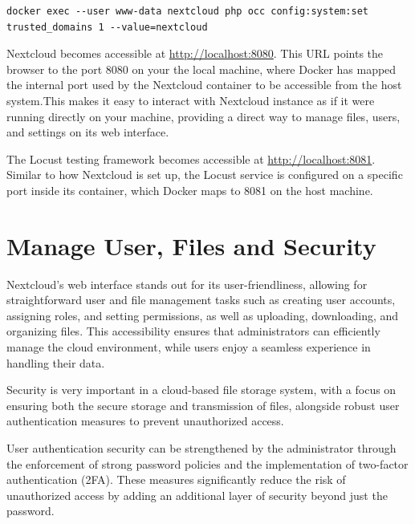 \documentclass[12pt]{article}
\begin{document}
\begin{verbatim}
docker exec --user www-data nextcloud php occ config:system:set
trusted_domains 1 --value=nextcloud
\end{verbatim}


Nextcloud becomes accessible at \url{http://localhost:8080}. This URL points the browser to the port 8080 on your the local machine, where Docker has mapped the internal port used by the Nextcloud container to be accessible from the host system.This makes it easy to interact with Nextcloud instance as if it were running directly on your machine, providing a direct way to manage files, users, and settings on its web interface.

The Locust testing framework becomes accessible at \url{http://localhost:8081}. Similar to how Nextcloud is set up, the Locust service is configured on a specific port inside its container, which Docker maps to 8081 on the host machine.

\section{Manage User, Files and Security}
\label{sec: Manage User and files}

Nextcloud's web interface stands out for its user-friendliness, allowing for straightforward user and file management tasks such as creating user accounts, assigning roles, and setting permissions, as well as uploading, downloading, and organizing files. This accessibility ensures that administrators can efficiently manage the cloud environment, while users enjoy a seamless experience in handling their data. 

Security is very important in a cloud-based file storage system, with a focus on ensuring both the secure storage and transmission of files, alongside robust user authentication measures to prevent unauthorized access.

User authentication security can be strengthened by the administrator through the enforcement of strong password policies and the implementation of two-factor authentication (2FA). These measures significantly reduce the risk of unauthorized access by adding an additional layer of security beyond just the password.
\end{document}
